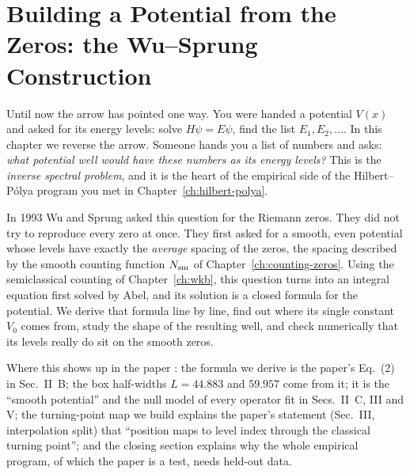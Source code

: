 \chapter{Building a Potential from the Zeros: the Wu--Sprung Construction}\label{ch:wu-sprung}

\begin{chapterintro}
Until now the arrow has pointed one way. You were handed a potential $V(x)$ and asked for its energy levels: solve $H\psi=E\psi$, find the list $E_1,E_2,\dots$. In this chapter we reverse the arrow. Someone hands you a list of numbers and asks: \emph{what potential well would have these numbers as its energy levels?} This is the \emph{inverse spectral problem}, and it is the heart of the empirical side of the Hilbert--P\'olya program you met in Chapter~\ref{ch:hilbert-polya}.

In 1993 Wu and Sprung \cite{wusprung} asked this question for the Riemann zeros. They did not try to reproduce every zero at once. They first asked for a smooth, even potential whose levels have exactly the \emph{average} spacing of the zeros, the spacing described by the smooth counting function $N_{\mathrm{sm}}$ of Chapter~\ref{ch:counting-zeros}. Using the semiclassical counting of Chapter~\ref{ch:wkb}, this question turns into an integral equation first solved by Abel, and its solution is a closed formula for the potential. We derive that formula line by line, find out where its single constant $V_0$ comes from, study the shape of the resulting well, and check numerically that its levels really do sit on the smooth zeros.

Where this shows up in the paper \cite{soniR1}: the formula we derive is the paper's Eq.~(2) in Sec.~II~B; the box half-widths $L=44.883$ and $59.957$ come from it; it is the ``smooth potential'' and the null model of every operator fit in Secs.~II~C, III and V; the turning-point map we build explains the paper's statement (Sec.~III, interpolation split) that ``position maps to level index through the classical turning point''; and the closing section explains why the whole empirical program, of which the paper is a test, needs held-out data.
\end{chapterintro}

